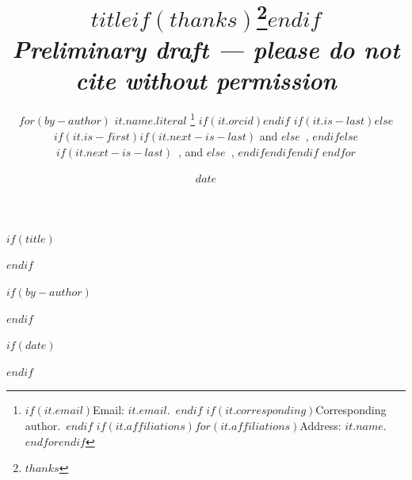 %
%
%

$if(title)$
\title{$title$$if(thanks)$\thanks{$thanks$}$endif$\\[0.3cm]%
{\normalsize\itshape Preliminary draft --- please do not cite without permission}%
}
$endif$

$if(by-author)$
\author{%
$for(by-author)$%
$it.name.literal$%
\thanks{%
$if(it.email)$Email: \href{mailto:$it.email$}{$it.email$}.\ $endif$%
$if(it.corresponding)$Corresponding author.\ $endif$%
$if(it.affiliations)$$for(it.affiliations)$Address: $it.name$.$endfor$$endif$%
}%
$if(it.orcid)$\enspace\textsuperscript{\normalsize{}}$endif$%
$if(it.is-last)$$else$\nolinebreak[4]$if(it.is-first)$$if(it.next-is-last)$ and $else$~, $endif$$else$$if(it.next-is-last)$~, and $else$~, $endif$$endif$$endif$%
$endfor$%
}
$endif$

$if(date)$
\date{$date$}
$endif$
